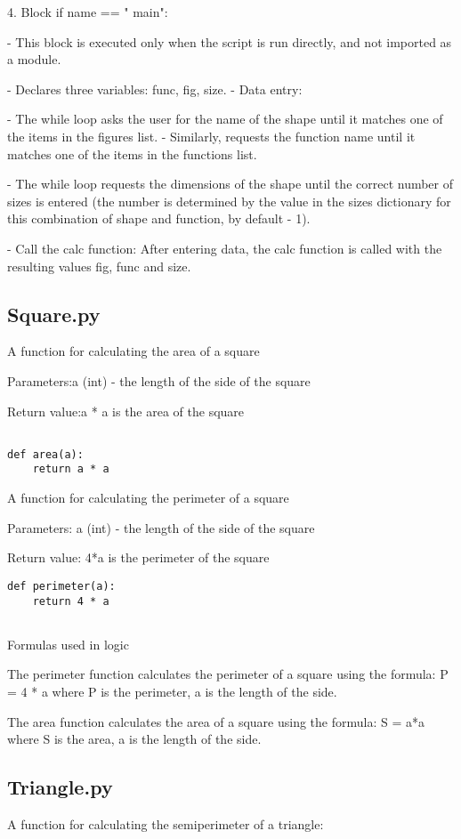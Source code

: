 \documentclass[12pt]{article}
\begin{document}
4. Block if name == " main":

- This block is executed only when the script is run directly, and not imported as a module. 

 - Declares three variables: func, fig, size.
 - Data entry:
 
 - The while loop asks the user for the name of the shape until it matches one of the items in the figures list.
 - Similarly, requests the function name until it matches one of the items in the functions list.
 
 - The while loop requests the dimensions of the shape until the correct number of sizes is entered (the number is determined by the value in the sizes dictionary for this combination of shape and function, by default - 1).
 
- Call the calc function: After entering data, the calc function is called with the resulting values fig, func and size.
 
\newpage
\subsection{Square.py}
A function for calculating the area of a square 

Parameters:a (int) - the length of the side of the square

Return value:a * a is the area of the square

\begin{verbatim}

def area(a):
    return a * a
\end{verbatim}
A function for calculating the perimeter of a square 

Parameters:
a (int) - the length of the side of the square 

Return value:
4*a is the perimeter of the square
\begin{verbatim}
def perimeter(a):
    return 4 * a
    
\end{verbatim}

Formulas used in logic

The perimeter function calculates the perimeter of a square using the formula: 
 P = 4 * a
where P is the perimeter, a is the length of the side.

The area function calculates the area of a square using the formula: 
 S = a*a
 where S is the area, a is the length of the side.
 \newpage
\subsection{Triangle.py}
A function for calculating the semiperimeter of a triangle: 
\end{document}
